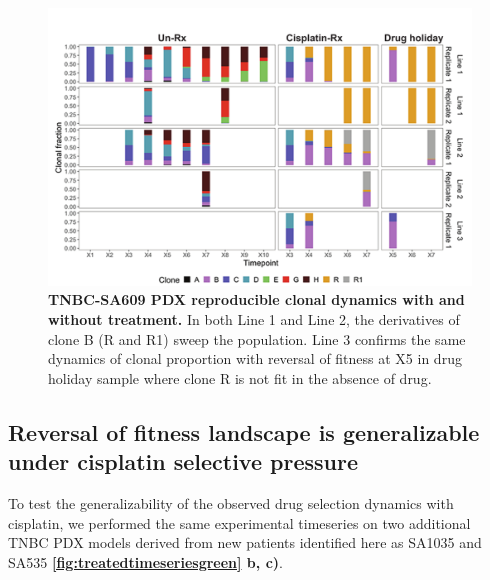 \begin{figure}
\centering
\includegraphics[width=\textwidth]{Figures/SA609barplotanalysis.pdf}
	
\caption[TNBC-SA609 PDX reproducible clonal dynamics with and without treatment]
	{\small
	\textbf{TNBC-SA609 PDX reproducible clonal dynamics with and without treatment.}
	    In both Line 1 and Line 2, the derivatives of clone B (R and R1) sweep the population. Line 3 confirms the same dynamics of clonal proportion with reversal of fitness at X5 in drug holiday sample where clone R is not fit in the absence of drug.
	}
	\label{fig:SA609barplotanalysis}
\end{figure}


\subsection{Reversal of fitness landscape is generalizable under cisplatin selective pressure}
To test the generalizability of the observed drug selection dynamics with cisplatin, we performed the same experimental timeseries on two additional TNBC PDX models derived from new patients identified here as SA1035 and SA535 \textbf{\autoref{fig:treatedtimeseriesgreen}  b, c)}. 


